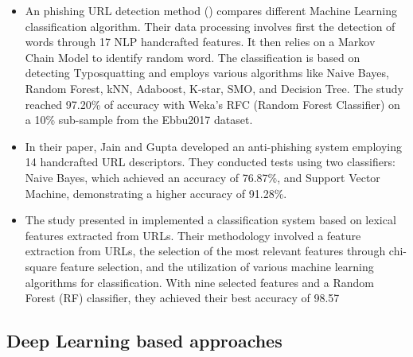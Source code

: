 \documentclass{article}
\begin{document}
    \begin{itemize}

        \item An phishing URL detection method (\cite{PhishingURLDetection}) compares different Machine Learning classification algorithm.
        Their data processing involves first the detection of words through 17 NLP handcrafted features.
        It then relies on a Markov Chain Model to identify random word.
        The classification is based on detecting Typosquatting and employs various algorithms like Naive Bayes, Random Forest, kNN, Adaboost, K-star, SMO, and Decision Tree.
        The study reached 97.20\% of accuracy with Weka's RFC (Random Forest Classifier) on a 10\% sub-sample from the Ebbu2017 dataset.

        \item In their paper\cite{PhishSafe}, Jain and Gupta developed an anti-phishing system employing 14 handcrafted URL descriptors.
        They conducted tests using two classifiers: Naive Bayes, which achieved an accuracy of 76.87\%, and Support Vector Machine, demonstrating a higher accuracy of 91.28\%.

        \item The study presented in\cite{LexicalFeatureSelection} implemented a classification system based on lexical features extracted from URLs. Their methodology involved a feature extraction from URLs, the selection of the most relevant features through chi-square feature selection, and the utilization of various machine learning algorithms for classification.
        With nine selected features and a Random Forest (RF) classifier, they achieved their best accuracy of 98.57%

    \end{itemize}

    \subsection{Deep Learning based approaches}\label{subsec:deep-learning-based-approaches}
\end{document}
